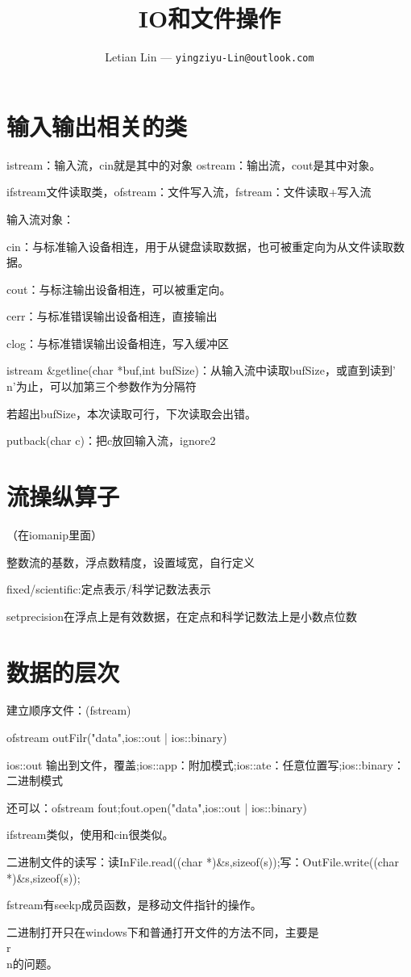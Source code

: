 \documentclass[UTF8]{ctexart}
\title{
	IO和文件操作
}
\author{
	Letian Lin --- \texttt{yingziyu-Lin@outlook.com}
}
\begin{document}
\maketitle
\section{输入输出相关的类}
istream：输入流，cin就是其中的对象  ostream：输出流，cout是其中对象。

ifstream文件读取类，ofstream：文件写入流，fstream：文件读取+写入流

输入流对象：

cin：与标准输入设备相连，用于从键盘读取数据，也可被重定向为从文件读取数据。

cout：与标注输出设备相连，可以被重定向。

cerr：与标准错误输出设备相连，直接输出

clog：与标准错误输出设备相连，写入缓冲区

istream \&getline(char *buf,int bufSize)：从输入流中读取bufSize，或直到读到'\\n'为止，可以加第三个参数作为分隔符

若超出bufSize，本次读取可行，下次读取会出错。

putback(char c)：把c放回输入流，ignore2
\section{流操纵算子}
（在iomanip里面）

整数流的基数，浮点数精度，设置域宽，自行定义

fixed/scientific:定点表示/科学记数法表示

setprecision在浮点上是有效数据，在定点和科学记数法上是小数点位数
\section{数据的层次}
建立顺序文件：(fstream)

ofstream outFilr("data",ios::out | ios::binary)

ios::out 输出到文件，覆盖;ios::app：附加模式;ios::ate：任意位置写;ios::binary：二进制模式

还可以：ofstream fout;fout.open("data",ios::out | ios::binary)

ifstream类似，使用和cin很类似。

二进制文件的读写：读InFile.read((char *)\&s,sizeof(s));写：OutFile.write((char *)\&s,sizeof(s));

fstream有seekp成员函数，是移动文件指针的操作。

二进制打开只在windows下和普通打开文件的方法不同，主要是\\r\\n的问题。
\end{document}
